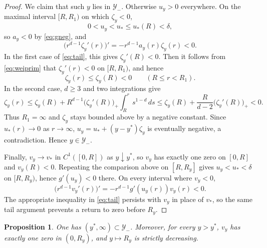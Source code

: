 \documentclass[12pt, a4paper, reqno]{amsart}
\numberwithin{equation}{section}
\newtheorem{proposition}[theorem]{Proposition}
\theoremstyle{definition}
\theoremstyle{remark}
\begin{document}
\begin{proof}
We claim that such $y$ lies in $\mathcal Y_-$. Otherwise $u_y>0$ everywhere. On
the maximal interval $[R,R_1)$ on which $\zeta_y<0$,
\[
  0<u_y<u_*\le u_*(R)<\delta,
\]
so $a_y<0$ by \eqref{eq:gneg}, and
\begin{equation}
\label{eq:weiprim}
  \bigl(r^{d-1}\zeta_y'(r)\bigr)'
  =-r^{d-1}a_y(r)\zeta_y(r)<0.
\end{equation}
In the first case of \eqref{eq:tail}, this gives $\zeta_y'(R)<0$. Then it follows from \eqref{eq:weiprim} that
$\zeta_y'(r)<0$ on $[R,R_1)$, and hence
\[
  \zeta_y(r)\le \zeta_y(R)<0
  \qquad (R\le r<R_1).
\]
In the second case, $d\ge3$ and two integrations
give
\[
  \zeta_y(r)
  \le \zeta_y(R)+R^{d-1}\bigl(\zeta_y'(R)\bigr)_+
       \int_R^r s^{1-d}\,ds
  \le \zeta_y(R)+\frac{R}{d-2}\bigl(\zeta_y'(R)\bigr)_+<0.
\]
Thus $R_1=\infty$ and $\zeta_y$ stays bounded above by a negative constant.
Since $u_*(r)\to0$ as $r\to\infty$,
$u_y=u_*+(y-y^*)\zeta_y$ is eventually negative, a contradiction. Hence
$y\in \mathcal Y_-$.

Finally, $v_y\to v_*$ in $C^1([0,R])$ as $y\downarrow y^*$, so $v_y$
has exactly one zero on
$[0,R]$ and $v_y(R)<0$. Repeating the comparison above on $[R,R_y]$
gives $u_y<u_*<\delta$ on $[R,R_y)$, hence $g'(u_y)<0$ there. On every interval where $v_y<0$,
\[
  \bigl(r^{d-1}v_y'(r)\bigr)'
  =-r^{d-1}g'(u_y(r))v_y(r)<0.
\]
The appropriate inequality in \eqref{eq:tail} persists with $v_y$ in place
of $v_*$, so the same tail argument prevents a return to zero before
$R_y$.
\end{proof}

\begin{proposition}\label{prop:Sneg}
One has $(y^*,\infty)\subset \mathcal Y_-$. Moreover, for every $y>y^*$,
$v_y$ has exactly one zero in $(0,R_y)$, and $y\mapsto R_y$ is strictly
decreasing.
\end{proposition}
\end{document}
